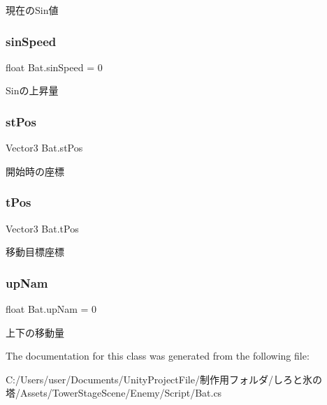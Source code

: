 現在の\+Sin値 

\mbox{\label{class_bat_a1fdb20de00fd364c6cf94fefdfa4305a}} 
\subsubsection{\texorpdfstring{sin\+Speed}{sinSpeed}}
{\footnotesize\ttfamily float Bat.\+sin\+Speed = 0\hspace{0.3cm}{\ttfamily [private]}}



Sinの上昇量 

\mbox{\label{class_bat_a00b206a83145c2273d7d6b4241562f60}} 
\subsubsection{\texorpdfstring{st\+Pos}{stPos}}
{\footnotesize\ttfamily Vector3 Bat.\+st\+Pos\hspace{0.3cm}{\ttfamily [private]}}



開始時の座標 

\mbox{\label{class_bat_a6520d007f8d93bb9d152706f69a7fe3f}} 
\subsubsection{\texorpdfstring{t\+Pos}{tPos}}
{\footnotesize\ttfamily Vector3 Bat.\+t\+Pos\hspace{0.3cm}{\ttfamily [private]}}



移動目標座標 

\mbox{\label{class_bat_acb46e48ec1c0fcd8a0a3f4b3b6903672}} 
\subsubsection{\texorpdfstring{up\+Nam}{upNam}}
{\footnotesize\ttfamily float Bat.\+up\+Nam = 0\hspace{0.3cm}{\ttfamily [private]}}



上下の移動量 



The documentation for this class was generated from the following file\+:\begin{DoxyCompactItemize}
\item 
C\+:/\+Users/user/\+Documents/\+Unity\+Project\+File/制作用フォルダ/しろと氷の塔/\+Assets/\+Tower\+Stage\+Scene/\+Enemy/\+Script/Bat.\+cs\end{DoxyCompactItemize}
